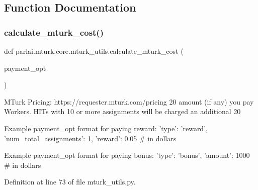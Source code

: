 \subsection{Function Documentation}
\mbox{\label{namespaceparlai_1_1mturk_1_1core_1_1mturk__utils_a4add40f6a463a3feb100a3c960ba3405}} 
\subsubsection{\texorpdfstring{calculate\+\_\+mturk\+\_\+cost()}{calculate\_mturk\_cost()}}
{\footnotesize\ttfamily def parlai.\+mturk.\+core.\+mturk\+\_\+utils.\+calculate\+\_\+mturk\+\_\+cost (\begin{DoxyParamCaption}\item[{}]{payment\+\_\+opt }\end{DoxyParamCaption})}

\begin{DoxyVerb}MTurk Pricing: https://requester.mturk.com/pricing 20%
amount (if any) you pay Workers. HITs with 10 or more assignments will be charged an
additional 20%

Example payment_opt format for paying reward:
{
    'type': 'reward',
    'num_total_assignments': 1,
    'reward': 0.05  # in dollars
}

Example payment_opt format for paying bonus:
{
    'type': 'bonus',
    'amount': 1000  # in dollars
}
\end{DoxyVerb}
 

Definition at line 73 of file mturk\+\_\+utils.\+py.


